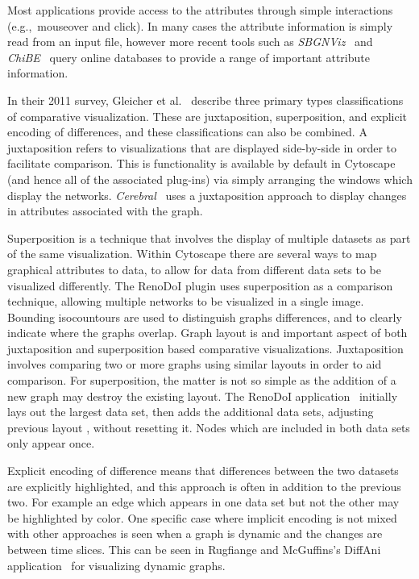 \documentclass[twocolumn]{bmcart}%
\begin{document}
Most applications provide access to the attributes through simple interactions (e.g.,~mouseover and click).
In many cases the attribute information is simply read from an input file, however more recent tools such as \textit{SBGNViz}~\cite{SBGNViz2015} and \textit{ChiBE}~\cite{Babur2010chibe} query online databases to provide a range of important attribute information.

In their 2011 survey, Gleicher et al.~\cite{Gleicher2011} describe three primary types classifications of comparative visualization.
These are juxtaposition, superposition, and explicit encoding of differences, and these classifications can also be combined.
A juxtaposition refers to visualizations that are displayed side-by-side in order to facilitate comparison.
This is functionality is available by default in Cytoscape (and hence all of the associated plug-ins) via simply arranging the windows which display the networks.
\textit{Cerebral}~\cite{Barsky2008cerebral} uses a juxtaposition approach to display changes in attributes associated with the graph.

Superposition is a technique that involves the display of multiple datasets as part of the same visualization.
Within Cytoscape there are several ways to map graphical attributes to data, to allow for data from different data sets to be visualized differently.
The RenoDoI plugin uses superposition as a comparison technique, allowing multiple networks to be visualized in a single image. Bounding isocountours are used to distinguish graphs differences, and to clearly indicate where the graphs overlap.
Graph layout is and important aspect of both juxtaposition and superposition based comparative visualizations.
Juxtaposition involves comparing two or more graphs using similar layouts in order to aid comparison.
For superposition, the matter is not so simple as the addition of a new graph may destroy the existing layout.
The RenoDoI application~\cite{Vehlow2015} initially lays out the largest data set, then adds the additional data sets, adjusting previous layout , without resetting it.
Nodes which are included in both data sets only appear once.

Explicit encoding of difference means that differences between the two datasets are explicitly highlighted, and this approach is often in addition to the previous two. For example an edge which appears in one data set but not the other may be highlighted by color.
One specific case where implicit encoding is not mixed with other approaches is seen when a graph is dynamic and the changes are between time slices.
This can be seen in Rugfiange and McGuffins's DiffAni application~\cite{Rufiange2013} for visualizing dynamic graphs.
\end{document}
